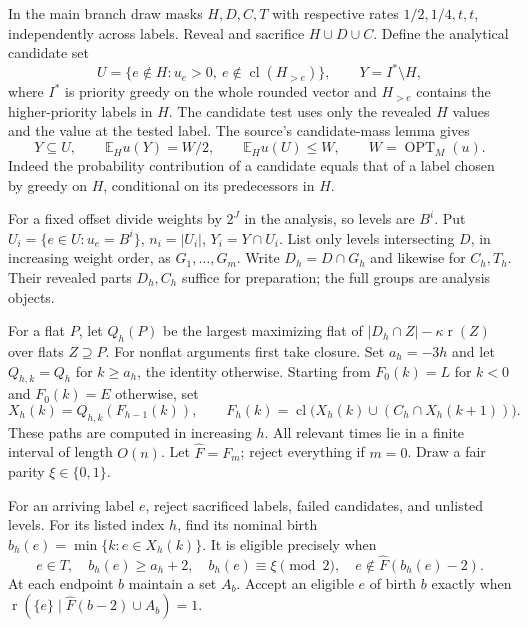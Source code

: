 \documentclass[11pt]{article}
\DeclareMathOperator{\cl}{cl}
\DeclareMathOperator{\rk}{r}
\DeclareMathOperator{\OPT}{OPT}
\newcommand{\E}{\mathbb E}
\begin{document}
In the main branch draw masks $H,D,C,T$ with respective rates
$1/2,1/4,t,t$, independently across labels. Reveal and sacrifice
$H\cup D\cup C$. Define the analytical candidate set
\[
 U=\{e\notin H:u_e>0,\ e\notin\cl(H_{>e})\},
 \qquad Y=I^*\setminus H,
\]
where $I^*$ is priority greedy on the whole rounded vector and $H_{>e}$
contains the higher-priority labels in $H$. The candidate test uses only
the revealed $H$ values and the value at the tested label. The source's
candidate-mass lemma gives
\begin{equation}\label{eq:filter}
 Y\subseteq U,\qquad \E_H u(Y)=W/2,\qquad \E_H u(U)\le W,
 \qquad W=\OPT_M(u).
\end{equation}
Indeed the probability contribution of a candidate equals that of a
label chosen by greedy on $H$, conditional on its predecessors in $H$.

For a fixed offset divide weights by $2^J$ in the analysis, so levels
are $B^i$. Put $U_i=\{e\in U:u_e=B^i\}$, $n_i=|U_i|$,
$Y_i=Y\cap U_i$. List only levels intersecting $D$, in increasing weight
order, as $G_1,\ldots,G_m$. Write $D_h=D\cap G_h$ and likewise for
$C_h,T_h$. Their revealed parts $D_h,C_h$ suffice for preparation;
the full groups are analysis objects.

For a flat $P$, let $Q_h(P)$ be the largest maximizing flat of
$|D_h\cap Z|-\kappa\rk(Z)$ over flats $Z\supseteq P$.
For nonflat arguments first take closure. Set $a_h=-3h$ and let
$Q_{h,k}=Q_h$ for $k\ge a_h$, the identity otherwise. Starting from
$F_0(k)=L$ for $k<0$ and $F_0(k)=E$ otherwise, set
\begin{equation}\label{eq:paths}
 X_h(k)=Q_{h,k}(F_{h-1}(k)),\qquad
 F_h(k)=\cl\bigl(X_h(k)\cup(C_h\cap X_h(k+1))\bigr).
\end{equation}
These paths are computed in increasing $h$. All relevant times lie in
a finite interval of length $O(n)$. Let $\widehat F=F_m$; reject
everything if $m=0$. Draw a fair parity $\xi\in\{0,1\}$.

For an arriving label $e$, reject sacrificed labels, failed candidates,
and unlisted levels. For its listed index $h$, find its nominal birth
$b_h(e)=\min\{k:e\in X_h(k)\}$. It is eligible precisely when
\[
 e\in T,\quad b_h(e)\ge a_h+2,\quad b_h(e)\equiv\xi\pmod2,
 \quad e\notin\widehat F(b_h(e)-2).
\]
At each endpoint $b$ maintain a set $A_b$. Accept an eligible $e$ of
birth $b$ exactly when
$\rk(\{e\}\mid\widehat F(b-2)\cup A_b)=1$.
\end{document}
